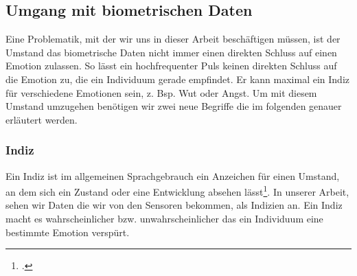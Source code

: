 \subsection{Umgang mit biometrischen Daten}
Eine Problematik, mit der wir uns in dieser Arbeit beschäftigen müssen, ist der Umstand das biometrische Daten nicht immer einen direkten Schluss auf einen Emotion zulassen. So lässt ein hochfrequenter Puls keinen direkten Schluss auf die Emotion zu, die ein Individuum gerade empfindet. Er kann maximal ein Indiz für verschiedene Emotionen sein, z. Bsp. Wut oder Angst. Um mit diesem Umstand umzugehen benötigen wir zwei neue Begriffe die im folgenden genauer erläutert werden. 
\subsubsection{Indiz}
Ein Indiz ist im allgemeinen Sprachgebrauch ein Anzeichen für einen Umstand, an dem sich ein Zustand oder eine Entwicklung absehen lässt\footcite[Vgl.][]{Dud18}. In unserer Arbeit, sehen wir Daten die wir von den Sensoren bekommen, als Indizien an. Ein Indiz macht es wahrscheinlicher bzw. unwahrscheinlicher das ein Individuum eine bestimmte Emotion verspürt. 
